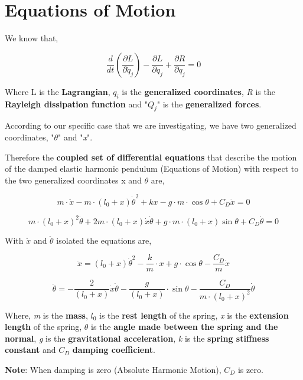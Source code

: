 
\section{{Equations of Motion}}
            
    {We know that,}
            
        $$\frac{d}{dt}\left(\frac{\partial L}{\partial \dot{q}_j}\right) - \frac{\partial L}{\partial q_j} + \frac{\partial R}{\partial q_j} = 0$$
            
    {Where L is the \textbf{Lagrangian}, $q_i$ is the \textbf{generalized coordinates}, \textit{R} is the \textbf{Rayleigh dissipation function} and "$Q_j$" is the \textbf{generalized forces}.}
            
    {According to our specific case that we are investigating, we have two generalized coordinates, "$\theta$" and "\textit{x}".}        
            
    {Therefore the \textbf{coupled set of differential equations} that describe the motion of the damped elastic harmonic pendulum (Equations of Motion) with respect to the two generalized coordinates x and $\theta$ are,}
            
        $$m\cdot\ddot{x} -m\cdot(l_0+x)\dot{\theta}^2 + kx - g\cdot m\cdot\cos{\theta} + C_D\dot{x} = 0$$
            
        $$m\cdot(l_0+x)^2\ddot{\theta} + 2m\cdot(l_0+x)\dot{x}\dot{\theta} + g\cdot m\cdot(l_0+x)\sin{\theta} + C_D\dot{\theta} = 0$$
            
    {With $\ddot{x}$ and $\ddot{\theta}$ isolated the equations are,}
            
        $$\ddot{x} = (l_0+x)\dot{\theta}^2 - \frac{k}{m}\cdot x + g\cdot\cos{\theta} - \frac{C_D}{m}\dot{x}$$
            
        $$\ddot{\theta} = - \frac{2}{(l_0+x)}\dot{x}\dot{\theta} - \frac{g}{(l_0+x)}\cdot\sin{\theta} - \frac{C_D}{m\cdot(l_0+x)^2}\dot{\theta}$$
            
    {Where, \textit{m} is the \textbf{mass}, $l_0$ is the \textbf{rest length} of the spring, \textit{x} is the \textbf{extension length} of the spring, $\theta$ is the \textbf{angle made between the spring and the normal}, \textit{g} is the \textbf{gravitational acceleration}, \textit{k} is the \textbf{spring stiffness constant} and $C_D$ \textbf{damping coefficient}.}
            
    {\textbf{Note}: When damping is zero (Absolute Harmonic Motion), $C_D$ is zero.}
            

